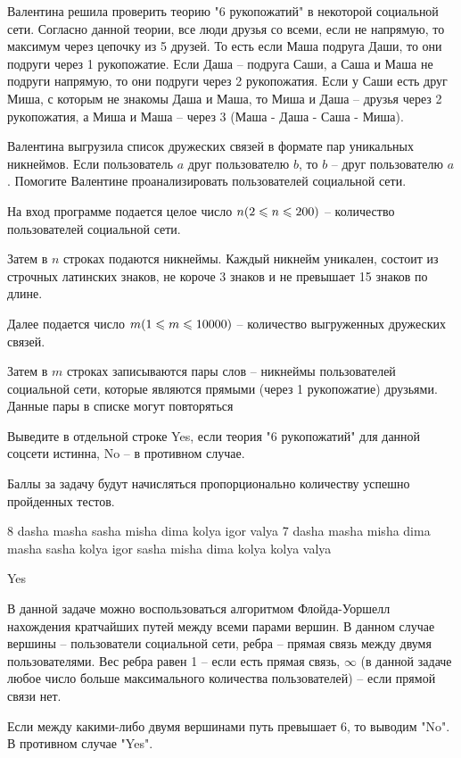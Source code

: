 
Валентина решила проверить теорию "6 рукопожатий" в некоторой социальной сети. Согласно данной теории, все люди друзья со всеми, если не напрямую, то максимум через цепочку из 5 друзей. То есть если Маша подруга Даши, то они подруги через 1 рукопожатие. Если Даша -- подруга Саши, а Саша и Маша не подруги напрямую, то они подруги через 2 рукопожатия. Если у Саши есть друг Миша, с которым не знакомы Даша и Маша, то Миша и Даша -- друзья через 2 рукопожатия, а Миша и Маша -- через 3 (Маша - Даша - Саша - Миша).

Валентина выгрузила список дружеских связей в формате пар уникальных никнеймов. Если пользователь $a$ друг пользователю $b$, то $b$ -- друг пользователю $a$. Помогите Валентине проанализировать пользователей социальной сети.


На вход программе подается целое число $ n\space(2\leq n\leq 200) $ -- количество пользователей социальной сети. 

Затем в $ n $ строках подаются никнеймы. Каждый никнейм уникален, состоит из строчных латинских знаков, не короче 3 знаков и не превышает 15 знаков по длине. 

Далее подается число $  m\space(1\leq m\leq 10000)$ -- количество выгруженных дружеских связей. 

Затем в $m$ строках записываются пары слов -- никнеймы пользователей социальной сети, которые являются прямыми (через 1 рукопожатие) друзьями. Данные пары в списке могут повторяться

\outputfmtSection

Выведите в отдельной строке Yes, если теория "6 рукопожатий" для данной соцсети истинна, No -- в противном случае.

\markSection

Баллы за задачу будут начисляться пропорционально количеству успешно пройденных тестов.


\begin{myverbbox}[\small]{\vinput}
    8
    dasha
    masha
    sasha
    misha
    dima
    kolya
    igor
    valya
    7
    dasha masha
    misha dima
    masha sasha
    kolya igor
    sasha misha
    dima kolya
    kolya valya
\end{myverbbox}

\begin{myverbbox}[\small]{\voutput}
    Yes
\end{myverbbox}

\solutionSection

В данной задаче можно воспользоваться алгоритмом Флойда-Уоршелл нахождения кратчайших путей между всеми парами вершин. В данном случае вершины -- пользователи социальной сети, ребра -- прямая связь между двумя пользователями. Вес ребра равен 1 -- если есть прямая связь, $\infty$ (в данной задаче любое число больше максимального количества пользователей) -- если прямой связи нет.

Если между какими-либо двумя вершинами путь превышает 6, то выводим "No". В противном случае "Yes".

